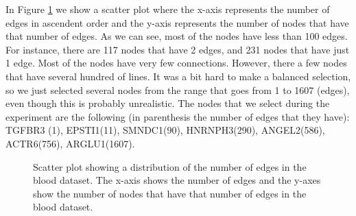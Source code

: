 In Figure \ref{fig:edges_nodes_blood} we show a scatter plot where the x-axis represents the number of edges in ascendent order and the y-axis represents the number of nodes that have that number of edges. As we can see, most of the nodes have less than 100 edges. For instance, there are 117 nodes that have 2 edges, and 231 nodes that have just 1 edge. Most of the nodes have very few connections. However, there a few nodes that have several hundred of lines. It was a bit hard to make a balanced selection, so we just selected several nodes from the range that goes from 1 to 1607 (edges), even though this is probably unrealistic. The nodes that we select during the experiment are the following (in parenthesis the number of edges that they have): TGFBR3 (1), EPSTI1(11), SMNDC1(90), HNRNPH3(290), ANGEL2(586), ACTR6(756), ARGLU1(1607).

\begin{figure}[h!]
  \centering
  \begin{minipage}{.8\textwidth}
  \end{minipage}
\caption{Scatter plot showing a distribution of the number of edges in the blood dataset. The x-axis shows the number of edges and the y-axes show the number of nodes that have that number of edges in the blood dataset.}
\label{fig:edges_nodes_blood}
\end{figure}

